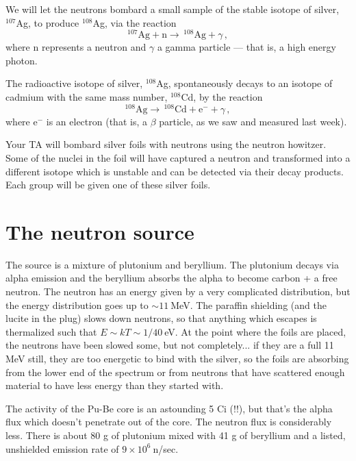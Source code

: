We will let the neutrons bombard a small sample of the stable isotope of silver, $^{107}$Ag, to
produce $^{108}$Ag, via the reaction
\begin{equation}
 ^{107}\textrm{Ag} + \mathrm{n} \rightarrow\, ^{108}\textrm{Ag} + \gamma \,,
\end{equation}
where $\mathrm{n}$ represents a neutron and $\gamma$ a gamma particle --- that is, a high energy photon.

The radioactive isotope of silver, $^{108}$Ag, spontaneously decays to an isotope of cadmium
with the same mass number, $^{108}$Cd, by the reaction
\begin{equation}
 ^{108}\textrm{Ag} \rightarrow\, ^{108}\textrm{Cd} + \mathrm{e}^- + \gamma \,,
\end{equation}
where $\mathrm{e}^-$ is an electron (that is, a $\beta$ particle, as we saw and measured last week).

Your TA will bombard silver foils with neutrons using the neutron howitzer. Some of the
nuclei in the foil will have captured a neutron and transformed into a different isotope
which is unstable and can be detected via their decay products. Each group will be given
one of these silver foils.

\section{The neutron source}

The source is a mixture of plutonium and beryllium. The plutonium decays via alpha emission and the beryllium absorbs the alpha to become carbon + a free neutron. The neutron has an energy given by a very complicated distribution, but the energy distribution goes up to $\sim 11\:$MeV. The paraffin shielding (and the lucite in the plug) slows down neutrons, so that anything which escapes is thermalized such that $E \sim kT \sim 1/40\:$eV. At the point where the foils are placed, the neutrons have been slowed some, but not completely... if they are a full 11 MeV still, they are too energetic to bind with the silver, so the foils are absorbing from the lower end of the spectrum or from neutrons that have scattered enough material to have less energy than they started with.

The activity of the Pu-Be core is an astounding 5 Ci (!!), but that's the alpha flux which doesn't penetrate out of the core. The neutron flux is considerably less. There is about 80 g of plutonium mixed with 41 g of beryllium and a listed, unshielded emission rate of $9 \times 10^6\:$n/sec.

